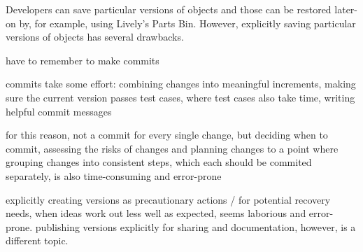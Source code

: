 Developers can save particular versions of objects and those can be restored later-on by, for example, using Lively's Parts Bin.
However, explicitly saving particular versions of objects has several drawbacks.


have to remember to make commits

commits take some effort: combining changes into meaningful increments, making sure the current version passes test cases, where test cases also take time, writing helpful commit messages

for this reason, not a commit for every single change, but deciding when to commit, assessing the risks of changes and planning changes to a point where grouping changes into consistent steps, which each should be commited separately, is also time-consuming and error-prone

explicitly creating versions as precautionary actions / for potential recovery needs, when ideas work out less well as expected, seems laborious and error-prone.
publishing versions explicitly for sharing and documentation, however, is a different topic.

% 




